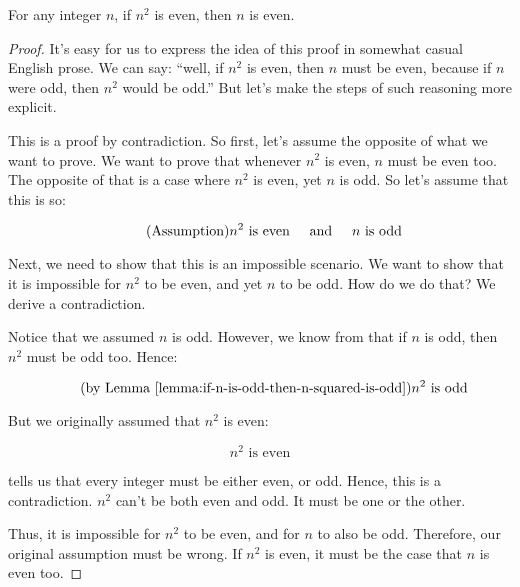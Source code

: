 \documentclass[../../../main.tex]{subfiles}
\begin{document}
\begin{lemma}
  \label{lemma:if-n-squared-is-even-then-n-is-even}
  For any integer $n$, if $n^{2}$ is even, then $n$ is even.
\end{lemma}

\begin{proof}

It's easy for us to express the idea of this proof in somewhat casual English prose. We can say: ``well, if $n^{2}$ is even, then $n$ must be even, because if $n$ were odd, then $n^{2}$ would be odd.'' But let's make the steps of such reasoning more explicit. 

This is a proof by contradiction. So first, let's assume the opposite of what we want to prove. We want to prove that whenever $n^{2}$ is even, $n$ must be even too. The opposite of that is a case where $n^{2}$ is even, yet $n$ is odd. So let's assume that this is so:

\begin{equation*}
  \tag{Assumption}
  n^{2} \text{ is even} \hskip 0.5cm \text{and} \hskip 0.5cm n \text{ is odd}
\end{equation*}

Next, we need to show that this is an impossible scenario. We want to show that it is impossible for $n^{2}$ to be even, and yet $n$ to be odd. How do we do that? We derive a contradiction.

Notice that we assumed $n$ is odd. However, we know from  that if $n$ is odd, then $n^{2}$ must be odd too. Hence:

\begin{equation*}
  \tag{by \lemmaref{lemma:if-n-is-odd-then-n-squared-is-odd}}
  n^{2} \text{ is odd}
\end{equation*}

But we originally assumed that $n^{2}$ is even:

\begin{equation*}
  \tag{from our Assumption}
  n^{2} \text{ is even}
\end{equation*}

 tells us that every integer must be either even, or odd. Hence, this is a contradiction. $n^{2}$ can't be both even and odd. It must be one or the other.

Thus, it is impossible for $n^{2}$ to be even, and for $n$ to also be odd. Therefore, our original assumption must be wrong. If $n^{2}$ is even, it must be the case that $n$ is even too.

\end{proof}
\end{document}
